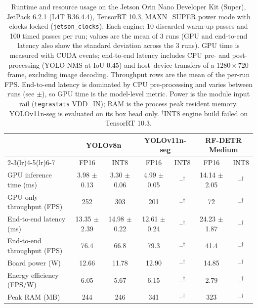 \begin{table}[t]
\centering
\caption{Runtime and resource usage on the Jetson Orin Nano Developer Kit (Super), JetPack 6.2.1 (L4T R36.4.4), TensorRT 10.3, MAXN\_SUPER power mode with clocks locked (\texttt{jetson\_clocks}). Each engine: 10 discarded warm-up passes and 100 timed passes per run; values are the mean of 3 runs (GPU and end-to-end latency also show the standard deviation across the 3 runs). GPU time is measured with CUDA events; end-to-end latency includes CPU pre- and post-processing (YOLO NMS at IoU 0.45) and host--device transfers of a $1280{\times}720$ frame, excluding image decoding. Throughput rows are the mean of the per-run FPS. End-to-end latency is dominated by CPU pre-processing and varies between runs (see $\pm$), so GPU time is the model-level metric. Power is the module input rail (\texttt{tegrastats} VDD\_IN); RAM is the process peak resident memory. YOLOv11n-seg is evaluated on its box head only. $^{\dagger}$INT8 engine build failed on TensorRT 10.3.}
\label{tab:edge-runtime}
\footnotesize\setlength{\tabcolsep}{4pt}
\begin{tabular}{@{}lcccccc@{}}
\toprule
 & \multicolumn{2}{c}{YOLOv8n} & \multicolumn{2}{c}{YOLOv11n-seg} & \multicolumn{2}{c}{RF-DETR Medium} \\
\cmidrule(lr){2-3}\cmidrule(lr){4-5}\cmidrule(lr){6-7}
 & FP16 & INT8 & FP16 & INT8 & FP16 & INT8 \\
\midrule
GPU inference time (ms) & 3.98 $\pm$ 0.13 & 3.30 $\pm$ 0.06 & 4.99 $\pm$ 0.05 & --$^{\dagger}$ & 14.14 $\pm$ 2.05 & --$^{\dagger}$ \\
GPU-only throughput (FPS) & 252 & 303 & 201 & --$^{\dagger}$ & 72 & --$^{\dagger}$ \\
End-to-end latency (ms) & 13.35 $\pm$ 2.39 & 14.98 $\pm$ 0.22 & 12.61 $\pm$ 0.24 & --$^{\dagger}$ & 24.23 $\pm$ 1.87 & --$^{\dagger}$ \\
End-to-end throughput (FPS) & 76.4 & 66.8 & 79.3 & --$^{\dagger}$ & 41.4 & --$^{\dagger}$ \\
Board power (W) & 12.66 & 11.78 & 12.90 & --$^{\dagger}$ & 14.85 & --$^{\dagger}$ \\
Energy efficiency (FPS/W) & 6.05 & 5.67 & 6.15 & --$^{\dagger}$ & 2.79 & --$^{\dagger}$ \\
Peak RAM (MB) & 244 & 246 & 341 & --$^{\dagger}$ & 323 & --$^{\dagger}$ \\
\bottomrule
\end{tabular}
\end{table}

